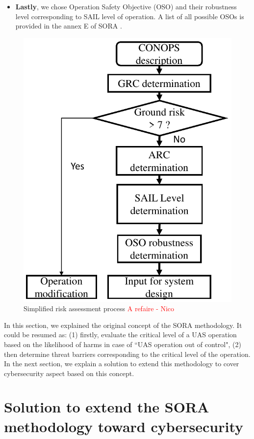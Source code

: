 \documentclass[a4paper, 10, conference]{ieeeconf}  %
\begin{document}
\begin{itemize}
   	\item \textbf{Lastly}, we chose Operation Safety Objective (OSO) and their robustness level corresponding to SAIL level of operation. A list of all possible OSOs is provided in the annex E of SORA \cite{Annex_E_SORA}.
   \end{itemize}
   
  \begin{figure}[!ht]
   	\centering
   	\includegraphics[width= 2.9 in]{image/original_workflow.pdf}
   	\caption{Simplified risk assessment process \textcolor{red}{A refaire - Nico}}
   	\label{figure: Simplified SORA process}
   \end{figure}  

In this section, we explained the original concept of the SORA methodology. It could be resumed as: (1) firstly, evaluate the critical level of a UAS operation based on the likelihood of harms in case of ``UAS operation out of control", (2) then determine threat barriers corresponding to the critical level of the operation. In the next section, we explain a solution to extend this methodology to cover cybersecurity aspect based on this concept.

\section{Solution to extend the SORA methodology toward cybersecurity}\label{sec:frame}
\end{document}
